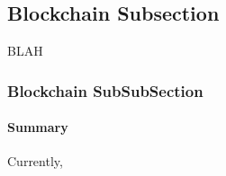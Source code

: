 \documentclass[class=article , crop=false, titlepage, twoside, multi={itemize, figure, verbatim}, float=false]{standalone}
\title{}  %
\begin{document}


\ifstandalone
\maketitle %
\tableofcontents %
\clearpage
\fi
\subsection{Blockchain Subsection}
BLAH
\medskip 
\subsubsection[Blockchain]{\Large Blockchain SubSubSection}
\paragraph[Summary]{Summary \texorpdfstring{\\}{}}
Currently, 
\end{document}
